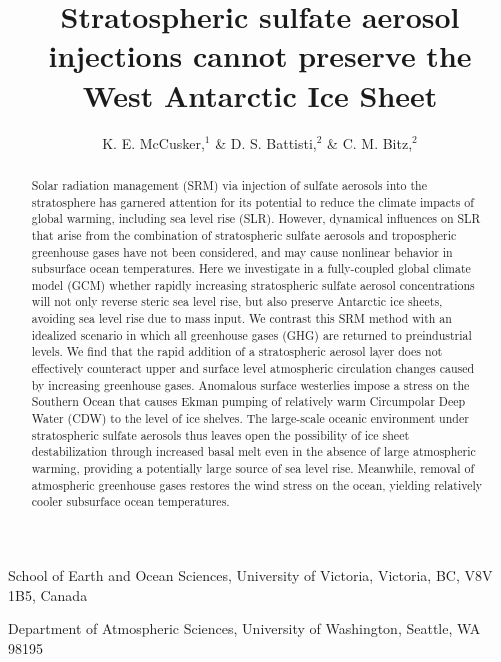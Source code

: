 \documentclass{nature}
\title{Stratospheric sulfate aerosol injections cannot preserve the West Antarctic Ice Sheet} %
\author{K. E. McCusker,$^{1}$ \& D. S. Battisti,$^{2}$ \& C. M. Bitz,$^2$}
\begin{document}
\maketitle

\begin{affiliations}
 \item School of Earth and Ocean Sciences, University of Victoria, Victoria, BC, V8V 1B5, Canada
 \item Department of Atmospheric Sciences, University of Washington, Seattle, WA 98195
\end{affiliations}


\begin{abstract}
Solar radiation management (SRM) via injection of sulfate aerosols into the stratosphere has garnered attention for its potential to reduce the climate impacts of global warming, including sea level rise (SLR). However, dynamical influences on SLR that arise from the combination of stratospheric sulfate aerosols and tropospheric greenhouse gases have not been considered, and may cause nonlinear behavior in subsurface ocean temperatures. Here we investigate in a fully-coupled global climate model (GCM) whether rapidly increasing stratospheric sulfate aerosol concentrations will not only reverse steric sea level rise, but also preserve Antarctic ice sheets, avoiding sea level rise due to mass input. We contrast this SRM method with an idealized scenario in which all greenhouse gases (GHG) are returned to preindustrial levels. We find that the rapid addition of a stratospheric aerosol layer does not effectively counteract upper and surface level atmospheric circulation changes caused by increasing greenhouse gases. Anomalous surface westerlies impose a stress on the Southern Ocean that causes Ekman pumping of relatively warm Circumpolar Deep Water (CDW) to the level of ice shelves. The large-scale oceanic environment under stratospheric sulfate aerosols thus leaves open the possibility of ice sheet destabilization through increased basal melt even in the absence of large atmospheric warming, providing a potentially large source of sea level rise. Meanwhile, removal of atmospheric greenhouse gases restores the wind stress on the ocean, yielding relatively cooler subsurface ocean temperatures. 

\end{abstract}

\end{document}
